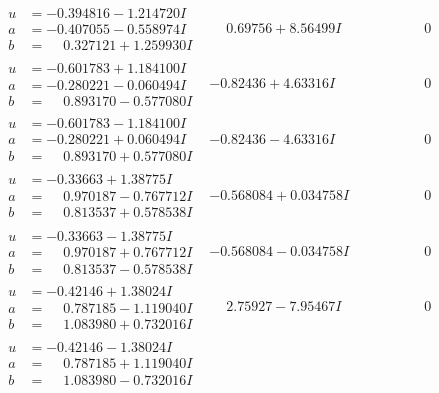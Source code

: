 \documentclass[1p]{elsarticle_modified}
\theoremstyle{definition}
\begin{document}
$$\begin{array}{c|c|c}
\begin{aligned}
u &= -0.394816 - 1.214720 I \\
a &= -0.407055 - 0.558974 I \\
b &= \phantom{-}0.327121 + 1.259930 I\end{aligned}
 & \phantom{-}0.69756 + 8.56499 I & \phantom{-0.000000 } 0 \\ \hline\begin{aligned}
u &= -0.601783 + 1.184100 I \\
a &= -0.280221 - 0.060494 I \\
b &= \phantom{-}0.893170 - 0.577080 I\end{aligned}
 & -0.82436 + 4.63316 I & \phantom{-0.000000 } 0 \\ \hline\begin{aligned}
u &= -0.601783 - 1.184100 I \\
a &= -0.280221 + 0.060494 I \\
b &= \phantom{-}0.893170 + 0.577080 I\end{aligned}
 & -0.82436 - 4.63316 I & \phantom{-0.000000 } 0 \\ \hline\begin{aligned}
u &= -0.33663 + 1.38775 I \\
a &= \phantom{-}0.970187 - 0.767712 I \\
b &= \phantom{-}0.813537 + 0.578538 I\end{aligned}
 & -0.568084 + 0.034758 I & \phantom{-0.000000 } 0 \\ \hline\begin{aligned}
u &= -0.33663 - 1.38775 I \\
a &= \phantom{-}0.970187 + 0.767712 I \\
b &= \phantom{-}0.813537 - 0.578538 I\end{aligned}
 & -0.568084 - 0.034758 I & \phantom{-0.000000 } 0 \\ \hline\begin{aligned}
u &= -0.42146 + 1.38024 I \\
a &= \phantom{-}0.787185 - 1.119040 I \\
b &= \phantom{-}1.083980 + 0.732016 I\end{aligned}
 & \phantom{-}2.75927 - 7.95467 I & \phantom{-0.000000 } 0 \\ \hline\begin{aligned}
u &= -0.42146 - 1.38024 I \\
a &= \phantom{-}0.787185 + 1.119040 I \\
b &= \phantom{-}1.083980 - 0.732016 I\end{aligned}

\end{array}$$
\end{document}
